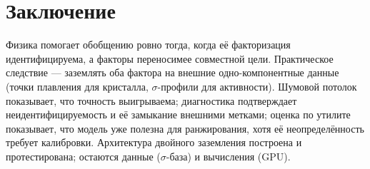 \documentclass[11pt]{article}
\theoremstyle{plain}
\theoremstyle{definition}
\begin{document}
\section{Заключение}
Физика помогает обобщению ровно тогда, когда её факторизация идентифицируема, а
факторы переносимее совместной цели. Практическое следствие --- заземлять оба
фактора на внешние одно-компонентные данные (точки плавления для кристалла,
$\sigma$-профили для активности). Шумовой потолок показывает, что точность
выигрываема; диагностика подтверждает неидентифицируемость и её замыкание внешними
метками; оценка по утилите показывает, что модель уже полезна для ранжирования,
хотя её неопределённость требует калибровки. Архитектура двойного заземления
построена и протестирована; остаются данные ($\sigma$-база) и вычисления (GPU).
\end{document}

